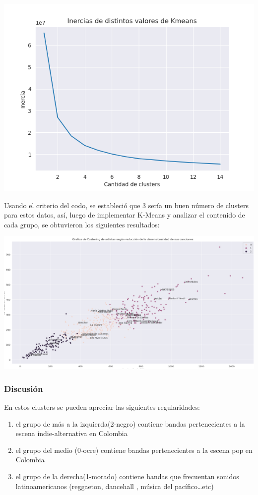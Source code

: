 \documentclass[11pt]{article}
\begin{document}
\begin{center}
\includegraphics[width=.9\linewidth]{./images/inercias1.png}
\end{center}

Usando el criterio del codo, se estableció
que 3 sería un buen número de clusters para estos datos, así, luego de
implementar K-Means y analizar el contenido de cada grupo, se obtuvieron los
siguientes resultados:

\begin{center}
\includegraphics[width=.9\linewidth]{./images/clustering1.png}
\end{center}

\subsubsection{Discusión}
\label{sec:org9f9890d}
En estos clusters se pueden apreciar las siguientes regularidades:
\begin{enumerate}
\item el grupo de más a la izquierda(2-negro) contiene bandas pertenecientes a la escena indie-alternativa en Colombia
\item el grupo del medio (0-ocre) contiene bandas pertenecientes a la escena pop en Colombia
\item el grupo de la derecha(1-morado) contiene bandas que frecuentan sonidos latinoamericanos (reggaeton, dancehall , música del pacífico\ldots{}etc)
\end{enumerate}
\end{document}
